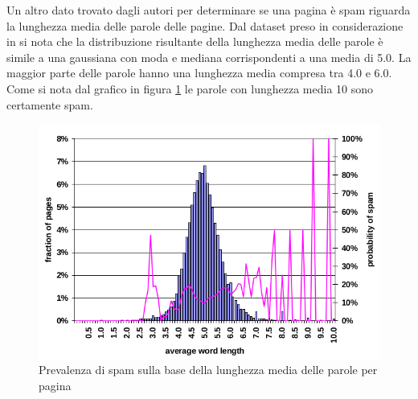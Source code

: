 Un altro dato trovato dagli autori per determinare se una pagina è spam riguarda la lunghezza media delle parole delle pagine. Dal dataset preso in considerazione in \cite{Ntoulas:2006:DSW:1135777.1135794} si nota che la distribuzione risultante della lunghezza media delle parole è simile a una gaussiana con moda e mediana corrispondenti a una media di 5.0. La maggior parte delle parole hanno una lunghezza media compresa tra 4.0 e 6.0. Come si nota dal grafico in figura \ref{fig:fetterly5} le parole con lunghezza media 10 sono certamente spam.
\begin{figure}[htbp]
\centering
\includegraphics[width=12cm]{immagini/fetterly/fetterly5}
\caption{Prevalenza di spam sulla base della lunghezza media delle parole per pagina}
\label{fig:fetterly5}
\end{figure}


